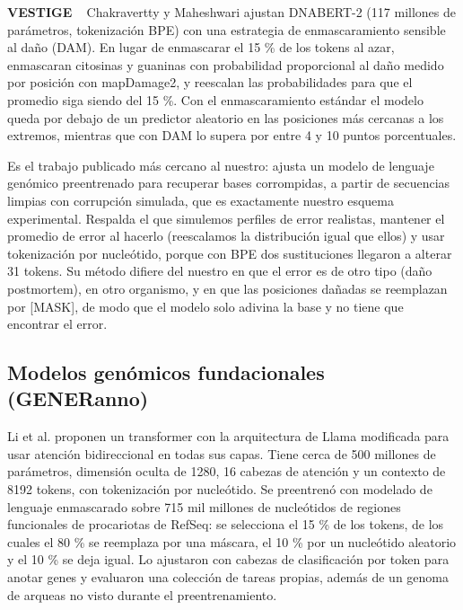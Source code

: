 \documentclass[sigconf,nonacm]{acmart}
\begin{document}
\textbf{VESTIGE} ~\cite{chakravertty2026vestige} Chakravertty y Maheshwari ajustan DNABERT-2 (117 millones de parámetros, tokenización BPE) con una estrategia de enmascaramiento sensible al daño (DAM). En lugar de enmascarar el 15 \% de los tokens al azar, enmascaran citosinas y guaninas con probabilidad proporcional al daño medido por posición con mapDamage2, y reescalan las probabilidades para que el promedio siga siendo del 15 \%. Con el enmascaramiento estándar el modelo queda por debajo de un predictor aleatorio en las posiciones más cercanas a los extremos, mientras que con DAM lo supera por entre 4 y 10 puntos porcentuales.

Es el trabajo publicado más cercano al nuestro: ajusta un modelo de lenguaje genómico preentrenado para recuperar bases corrompidas, a partir de secuencias limpias con corrupción simulada, que es exactamente nuestro esquema experimental. Respalda el que simulemos perfiles de error realistas, mantener el promedio de error al hacerlo (reescalamos la distribución igual que ellos) y usar tokenización por nucleótido, porque con BPE dos sustituciones llegaron a alterar 31 tokens. Su método difiere del nuestro en que el error es de otro tipo (daño postmortem), en otro organismo, y en que las posiciones dañadas se reemplazan por {[}MASK{]}, de modo que el modelo solo adivina la base y no tiene que encontrar el error.

\subsection{\texorpdfstring{Modelos genómicos fundacionales (GENERanno)~\cite{li2025generanno}}{Modelos genómicos fundacionales (GENERanno)}}

Li et al. proponen un transformer con la arquitectura de Llama modificada para usar atención bidireccional en todas sus capas. Tiene cerca de 500 millones de parámetros, dimensión oculta de 1280, 16 cabezas de atención y un contexto de 8192 tokens, con tokenización por nucleótido. Se preentrenó con modelado de lenguaje enmascarado sobre 715 mil millones de nucleótidos de regiones funcionales de procariotas de RefSeq: se selecciona el 15 \% de los tokens, de los cuales el 80 \% se reemplaza por una máscara, el 10 \% por un nucleótido aleatorio y el 10 \% se deja igual. Lo ajustaron con cabezas de clasificación por token para anotar genes y evaluaron una colección de tareas propias, además de un genoma de arqueas no visto durante el preentrenamiento.
\end{document}
